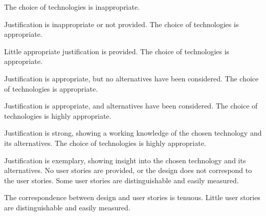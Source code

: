 \documentclass{../fal_assignment}
\begin{document}
\begin{markingrubric}
%
        \grade\fail The choice of technologies is inappropriate.
            \par Justification is inappropriate or not provided.
        \grade The choice of technologies is appropriate.
            \par Little appropriate justification is provided.
        \grade The choice of technologies is appropriate.
            \par Justification is appropriate, but no alternatives have been considered.
        \grade The choice of technologies is appropriate.
            \par Justification is appropriate, and alternatives have been considered.
        \grade The choice of technologies is highly appropriate.
            \par Justification is strong, showing a working knowledge of the chosen technology and its alternatives.
        \grade The choice of technologies is highly appropriate.
            \par Justification is exemplary, showing insight into the chosen technology and its alternatives.
%
        \grade\fail No user stories are provided, or the design does not correspond to the user stories.
        \grade Some user stories are distinguishable and easily measured.
            \par The correspondence between design and user stories is tenuous.
        \grade Little user stories are distinguishable and easily measured.

\end{markingrubric}
\end{document}

